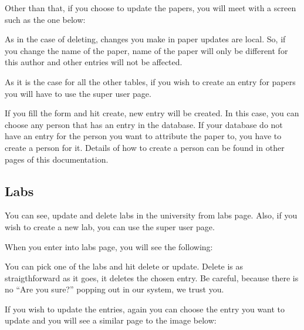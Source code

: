 \documentclass[letterpaper,10pt,english]{sphinxmanual}
\begin{document}
Other than that, if you choose to update the papers, you will meet with a screen
such as the one below:

\begin{figure}[htbp]
\centering

\noindent{}
\end{figure}

As in the case of deleting, changes you make in paper updates are local. So, if you change the name
of the paper, name of the paper will only be different for this author and other entries
will not be affected.

As it is the case for all the other tables, if you wish to create an entry for papers you
will have to use the super user page.

\begin{figure}[htbp]
\centering

\noindent{}
\end{figure}

If you fill the form and hit create, new entry will be created. In this case, you can choose any person
that has an entry in the database. If your database do not have an entry for the person you want to
attribute the paper to, you have to create a person for it. Details of how to create a person can be found
in other pages of this documentation.


\subsection{Labs}
\label{\detokenize{user/kaplan:labs}}
You can see, update and delete labs in the university from labs page. Also, if you wish to create a new lab,
you can use the super user page.

When you enter into labs page, you will see the following:

\begin{figure}[htbp]
\centering

\noindent{}
\end{figure}

You can pick one of the labs and hit delete or update. Delete is as straigthforward as it goes, it deletes the
chosen entry. Be careful, because there is no “Are you sure?” popping out in our system, we trust you.

If you wish to update the entries, again you can choose the entry you want to update and you will see a similar
page to the image below:
\end{document}

